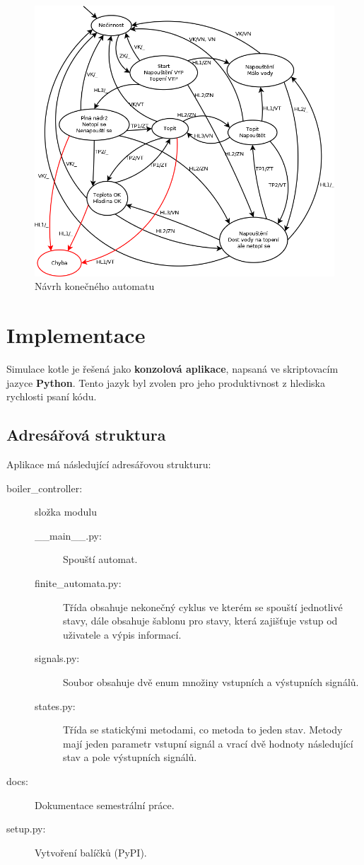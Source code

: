 \documentclass[12pt]{report}
\begin{document}
\begin{figure}[h]
		\centering
		\includegraphics[width=\textwidth]{./images/graf.png}	
		\caption{Návrh konečného automatu}
\end{figure}

\chapter{Implementace}
Simulace kotle je řešená jako \textbf{konzolová aplikace}, napsaná ve skriptovacím jazyce \textbf{Python}. Tento jazyk byl zvolen pro jeho produktivnost z hlediska rychlosti psaní kódu.\\

\section{Adresářová struktura}
	Aplikace má následující adresářovou strukturu:\\
	\begin{description}
	\item [boiler\_controller:] složka modulu

	\begin{description}
		\item [\_\_main\_\_.py:] Spouští automat.
		\item [finite\_automata.py:] Třída obsahuje nekonečný cyklus ve kterém se spouští jednotlivé stavy, dále obsahuje šablonu pro stavy, která zajišťuje vstup od uživatele a výpis informací.
		\item [signals.py:] Soubor obsahuje dvě enum množiny vstupních a výstupních signálů.
		\item [states.py:] Třída se statickými metodami, co metoda to jeden stav. Metody mají jeden parametr vstupní signál a vrací dvě hodnoty následující stav a pole výstupních signálů.
		
	\end{description}	
	\item [docs:] Dokumentace semestrální práce.			
	\item [setup.py:] Vytvoření balíčků (PyPI).
	\end{description}
\end{document}
